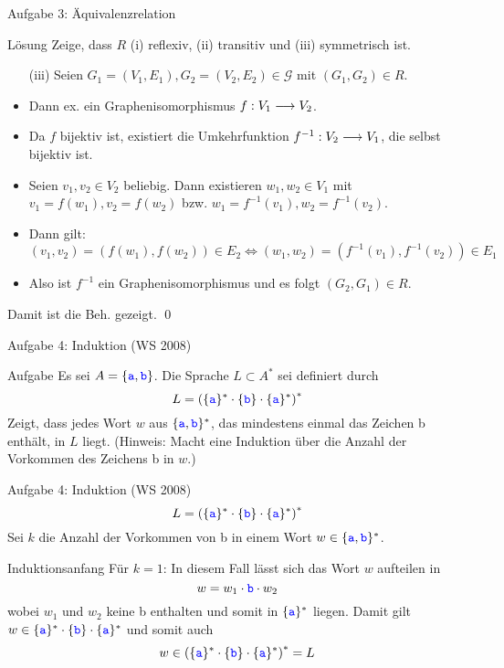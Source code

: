 \begin{frame}{Aufgabe 3: Äquivalenzrelation}
	\begin{block}{Lösung}
		Zeige, dass $R$ (i) reflexiv, (ii) transitiv und (iii) symmetrisch ist.
		\begin{itemize}
			\item[(iii)] Seien $G_1=(V_1,E_1),G_2=(V_2,E_2)\in\mathcal{G}$ mit $(G_1,G_2)\in R$.
			\item Dann ex. ein Graphenisomorphismus $f : V_1 \longrightarrow V_2$.
			\item Da $f$ bijektiv ist, existiert die Umkehrfunktion $f^{-1} : V_2 \longrightarrow V_1$, die selbst bijektiv ist.
			\item Seien $v_1, v_2 \in V_2$ beliebig. Dann existieren $w_1,w_2 \in V_1$ mit $v_1 = f(w_1), v_2 = f(w_2)$ bzw. $w_1=f^{-1}(v_1),w_2=f^{-1}(v_2)$.
			\item Dann gilt: 
				$(v_1,v_2)=(f(w_1),f(w_2)) \in E_2 \Leftrightarrow (w_1,w_2)=(f^{-1}(v_1),f^{-1}(v_2)) \in E_1 $
			\item Also ist $f^{-1}$ ein Graphenisomorphismus und es folgt $(G_2,G_1) \in R$.
		\end{itemize}
		Damit ist die Beh. gezeigt. \qed
	\end{block}
\end{frame}

\begin{frame}{Aufgabe 4: Induktion (WS 2008)}
	\begin{block}{Aufgabe}
		Es sei $A = \{\hbox{\textcolor{blue}{\texttt{a}}}, \hbox{\textcolor{blue}{\texttt{b}}}\}$. Die Sprache $L \subset A^\ast$ sei definiert durch
			$$L = \left(\{\hbox{\textcolor{blue}{\texttt{a}}}\}^\ast \cdot \{\hbox{\textcolor{blue}{\texttt{b}}}\} \cdot \{\hbox{\textcolor{blue}{\texttt{a}}}\}^\ast \right)^\ast$$
		Zeigt, dass jedes Wort $w$ aus $\{\hbox{\textcolor{blue}{\texttt{a}}}, \hbox{\textcolor{blue}{\texttt{b}}}\}^\ast$, das mindestens einmal das Zeichen \word b
		enthält, in $L$ liegt. (Hinweis: Macht eine Induktion über die Anzahl der
		Vorkommen des Zeichens \word b in $w$.)
	\end{block}
\end{frame}

\begin{frame}{Aufgabe 4: Induktion (WS 2008)}
	$$L = \left(\{\hbox{\textcolor{blue}{\texttt{a}}}\}^\ast \cdot \{\hbox{\textcolor{blue}{\texttt{b}}}\} \cdot \{\hbox{\textcolor{blue}{\texttt{a}}}\}^\ast \right)^\ast$$
	Sei $k$ die Anzahl der Vorkommen von \word b in einem Wort $w \in \{\hbox{\textcolor{blue}{\texttt{a}}}, \hbox{\textcolor{blue}{\texttt{b}}}\}^\ast$.
	\begin{block}{Induktionsanfang}  \pause
		Für $k = 1$: In diesem Fall lässt sich das Wort $w$ aufteilen in $$w = w_1 \cdot \hbox{\textcolor{blue}{\texttt{b}}} \cdot w_2$$ wobei $w_1$ und $w_2$ keine \word b enthalten und somit in $\{\hbox{\textcolor{blue}{\texttt{a}}}\}^\ast$ liegen. Damit gilt $w \in \{\hbox{\textcolor{blue}{\texttt{a}}}\}^\ast \cdot \{\hbox{\textcolor{blue}{\texttt{b}}}\} \cdot \{\hbox{\textcolor{blue}{\texttt{a}}}\}^\ast$ und somit auch $$w \in \left(\{\hbox{\textcolor{blue}{\texttt{a}}}\}^\ast \cdot \{\hbox{\textcolor{blue}{\texttt{b}}}\} \cdot \{\hbox{\textcolor{blue}{\texttt{a}}}\}^\ast \right)^\ast = L$$
	\end{block}
\end{frame}


